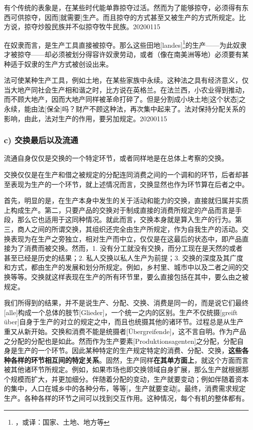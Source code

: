 \documentclass[a4paper,twoside,12pt]{ctexart}
\begin{document}
有个传统的表象是，在某些时代能单靠掠夺过活。然而为了能够掠夺，必须得有东西可供掠夺，因而[就需要]生产。而且掠夺的方式甚至又被生产的方式所规定。比方说，掠夺炒股民族并不似掠夺牧牛民族。20200115

在奴隶而言，是生产工具直接被掠夺。那么这些田地[landes]\footnote{，或译：国家、土地、地方等}的生产——为此奴隶才被掠夺——却必须被划分得容许奴隶劳动，或者（像在南美洲等地）必须要有某种适于奴隶的生产方式被创设出来。

法可使某种生产工具，例如土地，在某些家族中永续。这种法之具有经济意义，仅当大地产同社会生产相和谐之时，比方说在英格兰。在法兰西，小农业得到推动，而不顾大地产，因而大地产同样被革命打碎了。但是分割成小块土地[这个状态]之永续，能由法[保全]吗？财产不顾这种法，再次集中起来了。法对保持分配关系的影响，由此，法对生产的作用，要另加规定。20200115

\subsubsection{c) 交换最后以及流通}

流通自身仅仅是交换的一个特定环节，或者同样地是在总体上考察的交换。

交换仅仅是在生产和借之被规定的分配连同消费之间的一个调和的环节，后者却甚至表现为生产的一个环节，就上述情况而言，交换显然也作为环节算在后者之中。 

首先，明显的是，在生产本身中发生的关于活动和能力的交换，直接就归属并实质上构成生产。第二，只要产品的交换对于制成直接的消费所规定的产品而言是手段，那么它也适用于这同种情况。就此而言，交换本身就是算入生产的行为。第三，商人之间的所谓交换，其组织还完全由生产所规定，作为自我生产的活动。交换表现为在生产之旁独立，相对生产而中立，仅仅是在这最后的状态中，即产品直接为了消费而被交换。然而，1. 没有分工就没有交换，而分工现在是天然的或者甚至已经是历史的结果；2. 私人交换以私人生产为前提；3. 交换的深度及其广度和方式，都由生产的发展和划分所规定。例如，乡村里、城市中以及二者之间的交换等等。交换就这样表现在生产的所有环节里，要么直接包括在其中，要么由之被规定。

我们所得到的结果，并不是说生产、分配、交换、消费是同一的，而是说它们最终[alle]构成一个总体的肢节[Glieder]，一个统一之内的区别。生产不仅统摄[greift über]自身于生产的对立的规定之中，而且也统摄其他的诸环节。过程总是从生产重又从新开始。交换和消费不能是统摄者[Übergreifende]，这不言自明。作为产品之分配的分配也是如此。然而作为生产要素[Produktionsagenten]之分配，分配自身是生产的一个环节。因此某种特定的生产规定特定的消费、分配、交换，\textbf{这些各种各样的环节相互间的特定关系}。固然，生产同样\textbf{在其单方面上}，就这个方面而言被其他诸环节所规定。例如，如果市场也即交换领域自身扩展，那么生产就根据那个规模而扩大，并更加细分。伴随着分配的变动，生产就要变动；例如伴随着资本的集中，人口在城乡中的各种分布，等等[，生产就要变动]。最终，消费需求规定生产。各种各样的环节之间可以找到交互作用。这种情况，每个有机的整体都有。
\end{document}
